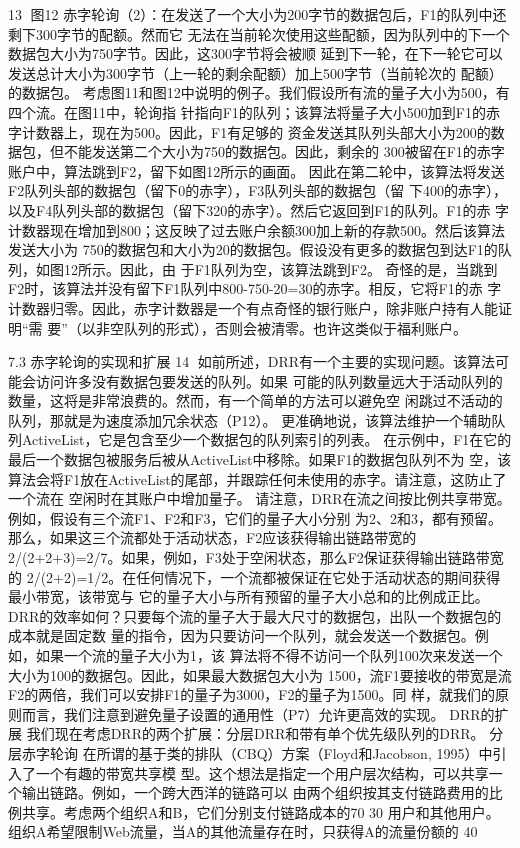                                               13
图12
赤字轮询（2）：在发送了一个大小为200字节的数据包后，F1的队列中还剩下300字节的配额。然而它
无法在当前轮次使用这些配额，因为队列中的下一个数据包大小为750字节。因此，这300字节将会被顺
延到下一轮，在下一轮它可以发送总计大小为300字节（上一轮的剩余配额）加上500字节（当前轮次的
配额）的数据包。
考虑图11和图12中说明的例子。我们假设所有流的量子大小为500，有四个流。在图11中，轮询指
针指向F1的队列；该算法将量子大小500加到F1的赤字计数器上，现在为500。因此，F1有足够的
资金发送其队列头部大小为200的数据包，但不能发送第二个大小为750的数据包。因此，剩余的
300被留在F1的赤字账户中，算法跳到F2，留下如图12所示的画面。
因此在第二轮中，该算法将发送F2队列头部的数据包（留下0的赤字），F3队列头部的数据包（留
下400的赤字），以及F4队列头部的数据包（留下320的赤字）。然后它返回到F1的队列。F1的赤
字计数器现在增加到800；这反映了过去账户余额300加上新的存款500。然后该算法发送大小为
750的数据包和大小为20的数据包。假设没有更多的数据包到达F1的队列，如图12所示。因此，由
于F1队列为空，该算法跳到F2。
奇怪的是，当跳到F2时，该算法并没有留下F1队列中800-750-20=30的赤字。相反，它将F1的赤
字计数器归零。因此，赤字计数器是一个有点奇怪的银行账户，除非账户持有人能证明“需
要”（以非空队列的形式），否则会被清零。也许这类似于福利账户。

7.3 赤字轮询的实现和扩展
                                                 14
如前所述，DRR有一个主要的实现问题。该算法可能会访问许多没有数据包要发送的队列。如果
可能的队列数量远大于活动队列的数量，这将是非常浪费的。然而，有一个简单的方法可以避免空
闲跳过不活动的队列，那就是为速度添加冗余状态（P12）。
更准确地说，该算法维护一个辅助队列ActiveList，它是包含至少一个数据包的队列索引的列表。
在示例中，F1在它的最后一个数据包被服务后被从ActiveList中移除。如果F1的数据包队列不为
空，该算法会将F1放在ActiveList的尾部，并跟踪任何未使用的赤字。请注意，这防止了一个流在
空闲时在其账户中增加量子。
请注意，DRR在流之间按比例共享带宽。例如，假设有三个流F1、F2和F3，它们的量子大小分别
为2、2和3，都有预留。那么，如果这三个流都处于活动状态，F2应该获得输出链路带宽的
2/(2+2+3)=2/7。如果，例如，F3处于空闲状态，那么F2保证获得输出链路带宽的
2/(2+2)=1/2。在任何情况下，一个流都被保证在它处于活动状态的期间获得最小带宽，该带宽与
它的量子大小与所有预留的量子大小总和的比例成正比。
DRR的效率如何？只要每个流的量子大于最大尺寸的数据包，出队一个数据包的成本就是固定数
量的指令，因为只要访问一个队列，就会发送一个数据包。例如，如果一个流的量子大小为1，该
算法将不得不访问一个队列100次来发送一个大小为100的数据包。因此，如果最大数据包大小为
1500，流F1要接收的带宽是流F2的两倍，我们可以安排F1的量子为3000，F2的量子为1500。同
样，就我们的原则而言，我们注意到避免量子设置的通用性（P7）允许更高效的实现。
DRR的扩展
我们现在考虑DRR的两个扩展：分层DRR和带有单个优先级队列的DRR。
分层赤字轮询
在所谓的基于类的排队（CBQ）方案（Floyd和Jacobson, 1995）中引入了一个有趣的带宽共享模
型。这个想法是指定一个用户层次结构，可以共享一个输出链路。例如，一个跨大西洋的链路可以
由两个组织按其支付链路费用的比例共享。考虑两个组织A和B，它们分别支付链路成本的70%
30%
用户和其他用户。组织A希望限制Web流量，当A的其他流量存在时，只获得A的流量份额的
40%




